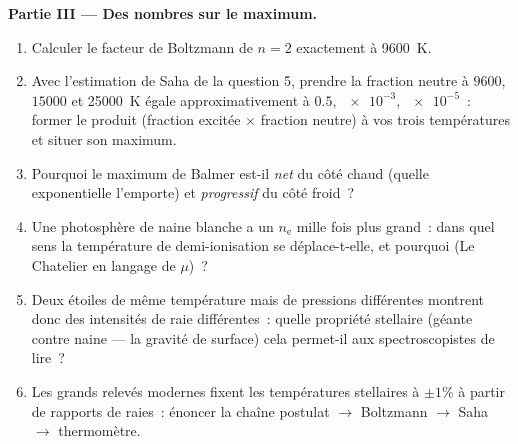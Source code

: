 \begin{problem}
\medskip\noindent\textbf{Partie III --- Des nombres sur le maximum.}
\begin{enumerate}[resume]
  \item Calculer le facteur de Boltzmann de $n = 2$ exactement à
        \qty{9600}{K}.
  \item Avec l'estimation de Saha de la question 5, prendre la fraction
        neutre à $9600$, $15000$ et \qty{25000}{K} égale
        approximativement à $0.5$, $\num{e-3}$, $\num{e-5}$~: former
        le produit (fraction excitée $\times$ fraction neutre) à vos
        trois températures et situer son maximum.
  \item Pourquoi le maximum de Balmer est-il \emph{net} du côté chaud
        (quelle exponentielle l'emporte) et \emph{progressif} du côté
        froid~?
  \item Une photosphère de naine blanche a un $n_{\text{e}}$ mille
        fois plus grand~: dans quel sens la température de
        demi-ionisation se déplace-t-elle, et pourquoi (Le Chatelier
        en langage de $\mu$)~?
  \item Deux étoiles de même température mais de pressions
        différentes montrent donc des intensités de raie
        différentes~: quelle propriété stellaire (géante contre naine
        --- la gravité de surface) cela permet-il aux spectroscopistes
        de lire~?
  \item Les grands relevés modernes fixent les températures
        stellaires à $\pm1\%$ à partir de rapports de raies~: énoncer
        la chaîne postulat $\to$ Boltzmann $\to$ Saha $\to$
        thermomètre.
\end{enumerate}


\end{problem}
